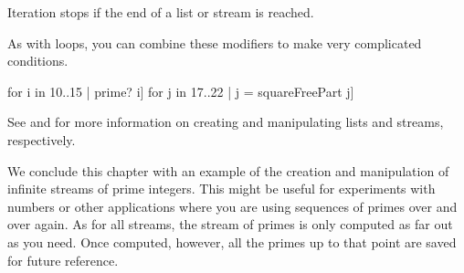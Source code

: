 {\begin{xtc}
\end{xtc}
\begin{xtc}
\begin{xtccomment}
Iteration stops if the end of a list or stream is reached.
\end{xtccomment}
\begin{spadsrc}
\end{spadsrc}
\begin{TeXOutput}
\begin{fricasmath}{10}
%
\end{fricasmath}
\end{TeXOutput}
\end{xtc}
\begin{xtc}
\begin{xtccomment}
As with loops, you can combine these modifiers to make very
complicated conditions.
\end{xtccomment}
\begin{spadsrc}
[[[i,j] for i in 10..15 | prime? i] for j in 17..22 | j = squareFreePart j]
\end{spadsrc}
\begin{TeXOutput}
\begin{fricasmath}{11}
%
\end{fricasmath}
\end{TeXOutput}
\end{xtc}

See  and  for more information on creating and
manipulating lists and streams, respectively.


We conclude this chapter with an example of the creation and manipulation
of infinite streams of prime integers.
This might be useful for experiments with numbers or other applications
where you are using sequences of primes over and over again.
As for all streams, the stream of primes is only computed as far out as you
need.
Once computed, however, all the primes up to that point are saved for
future reference.

}
